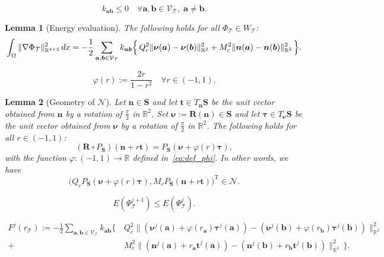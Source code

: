 \documentclass[10pt,a4paper]{amsart}
\newtheorem{lemma}{Lemma}
\newcommand{\Real}{\mathbb{R}}
\newcommand{\bR}{{\boldsymbol R}}
\newcommand{\bS}{{\boldsymbol S}}
\newcommand{\ba}{{\boldsymbol a}}
\newcommand{\bb}{{\boldsymbol b}}
\newcommand{\bn}{{\boldsymbol n}}
\newcommand{\bnu}{{\boldsymbol \nu}}
\newcommand{\bt}{{\boldsymbol t}}
\newcommand{\btau}{{\boldsymbol \tau}}
\newcommand{\calN}{\mathcal{N}}
\newcommand{\calT}{\mathcal{T}}
\newcommand{\calV}{\mathcal{V}}
\newcommand{\disr}{r_\calT}
\newcommand{\dx}{\,{\rm dx}}
\newcommand{\tr}{^{\mathrm{T}}}
\newcommand{\vertex}{\calV_\calT}
\begin{document}
\begin{equation} \label{eq:DMP}
k_{\ba\bb} \le 0 \quad \forall \ba,\bb \in \vertex, \; \ba\ne\bb.
\end{equation}

\begin{lemma}[Energy evaluation] \label{lem:engy_eval}
The following holds for all $\Phi_\calT \in W_\calT$:
\begin{equation} \label{eq:engy_eval}
\int_\Omega \|\nabla \Phi_\calT\|_{\Real^{4\times2}}^2 \dx = - \frac12
\sum_{\ba,\bb\in\vertex} k_{\ba\bb}\Big\{ \, Q_c^2\|\bnu(\ba)-\bnu(\bb)\|_{\Real^2}^2
+ M_c^2\|\bn(\ba)-\bn(\bb)\|_{\Real^2}^2 \, \Big\}.
\end{equation}
\end{lemma}

\begin{equation} \label{eq:def_phi}
\varphi(r) := \frac{2r}{1-r^2} \quad \forall r\in(-1,1).
\end{equation}

\begin{lemma}[Geometry of $\calN$] \label{lem:phi}
Let $\bn\in\bS$ and let $\bt\in T_{\bn}\bS$ be the unit vector 
obtained from $\bn$ by a rotation
of $\frac{\pi}{2}$ in $\Real^2$. Set $\bnu:=\bR(\bn)\in\bS$ and let 
$\btau\in T_{\bnu}\bS$ be the unit vector obtained from $\bnu$ by a rotation
of $\frac{\pi}{2}$ in $\Real^2$. The following holds for all $r\in (-1,1)$:
\begin{equation} \label{eq:RPS}
(\bR \circ P_{\bS})(\bn + r \bt) = P_{\bS}(\bnu + \varphi(r)\btau),
\end{equation}
with the function $\varphi:(-1,1)\rightarrow\Real$ defined in~\eqref{eq:def_phi}. 
In other words, we have
\begin{equation} \label{eq:RPinN}
\big(Q_c P_{\bS}(\bnu + \varphi(r)\btau),M_cP_{\bS}(\bn + r \bt)\big)\tr \in \calN.
\end{equation}
\end{lemma}

\begin{equation} \label{eq:enrg_decr_calT}
E(\Psi_\calT^{j+1}) \le E(\Psi_\calT^{j}).
\end{equation}

\begin{align}
F^j(\disr) := -\frac12 \sum_{\ba,\bb\in\vertex} k_{\ba\bb} \Big\{ \,
&Q_c^2\|(\bnu^j(\ba)+\varphi(r_{\ba})\btau^j(\ba))-(\bnu^j(\bb)+\varphi(r_{\bb})\btau^j(\bb))\|_{\Real^2}^2 \nonumber \\
+ {} &M_c^2\|(\bn^j(\ba)+r_{\ba}\bt^j(\ba))-(\bn^j(\bb)+r_{\bb}\bt^j(\bb))\|_{\Real^2}^2
\, \Big\}. \label{eq:def_Fj}
\end{align} 
\end{document}
